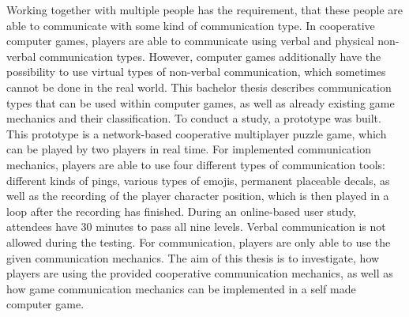 Working together with multiple people has the requirement, that these people are able to communicate with some kind of communication type.
In cooperative computer games, players are able to communicate using verbal and physical non-verbal communication types. However, computer games additionally have the possibility to use virtual types of non-verbal communication, which sometimes cannot be done in the real world.
This bachelor thesis describes communication types that can be used within computer games, as well as already existing game mechanics and their classification.
To conduct a study, a prototype was built. This prototype is a network-based cooperative multiplayer puzzle game, which can be played by two players in real time. For implemented communication mechanics, players are able to use four different types of communication tools: different kinds of pings, various types of emojis, permanent placeable decals, as well as the recording of the player character position, which is then played in a loop after the recording has finished.
During an online-based user study, attendees have 30 minutes to pass all nine levels. 
Verbal communication is not allowed during the testing. For communication, players are only able to use the given communication mechanics.
The aim of this thesis is to investigate, how players are using the provided cooperative communication mechanics, as well as how game communication mechanics can be implemented in a self made computer game. 